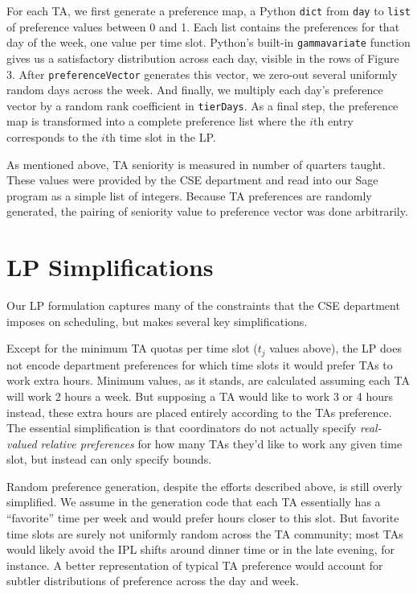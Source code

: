 \documentclass{article}
\begin{document}
\begin{multicols}{2}
For each TA, we first generate a preference map, a Python \texttt{dict} from \texttt{day} to \texttt{list} of preference values between 0 and 1. Each list contains the preferences for that day of the week, one value per time slot. Python's built-in \texttt{gammavariate} function gives us a satisfactory distribution across each day, visible in the rows of Figure 3. After \texttt{preferenceVector} generates this vector, we zero-out several uniformly random days across the week. And finally, we multiply each day's preference vector by a random rank coefficient in \texttt{tierDays}. As a final step, the preference map is transformed into a complete preference list where the $i$th entry corresponds to the $i$th time slot in the LP.

As mentioned above, TA seniority is measured in number of quarters taught. These values were provided by the CSE department and read into our Sage program as a simple list of integers. Because TA preferences are randomly generated, the pairing of seniority value to preference vector was done arbitrarily.

\section*{LP Simplifications}

Our LP formulation captures many of the constraints that the CSE department imposes on scheduling, but makes several key simplifications.

Except for the minimum TA quotas per time slot ($t_j$ values above), the LP does not encode department preferences for which time slots it would prefer TAs to work extra hours. Minimum values, as it stands, are calculated assuming each TA will work 2 hours a week. But supposing a TA would like to work 3 or 4 hours instead, these extra hours are placed entirely according to the TAs preference. The essential simplification is that coordinators do not actually specify \textit{real-valued relative preferences} for how many TAs they'd like to work any given time slot, but instead can only specify bounds.

Random preference generation, despite the efforts described above, is still overly simplified. We assume in the generation code that each TA essentially has a ``favorite'' time per week and would prefer hours closer to this slot. But favorite time slots are surely not uniformly random across the TA community; most TAs would likely avoid the IPL shifts around dinner time or in the late evening, for instance. A better representation of typical TA preference would account for subtler distributions of preference across the day and week.


\end{multicols}
\end{document}
